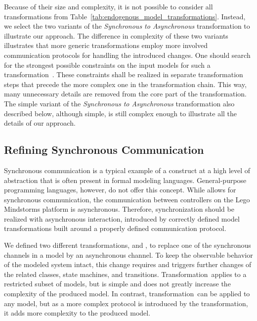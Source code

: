 Because of their size and complexity, it is not possible to consider all transformations from Table~\ref{tab:endogenous_model_transformations}.
Instead, we select the two variants of the \emph{Synchronous to Asynchronous} transformation to illustrate our approach.
The difference in complexity of these two variants illustrates that more generic transformations employ more involved communication protocols for handling the introduced changes.
One should search for the strongest possible constraints on the input models for such a transformation~\cite{SLCOexploring2011}.
These constraints shall be realized in separate transformation steps that precede the more complex one in the transformation chain.
This way, many unnecessary details are removed from the core part of the transformation.
The simple variant of the \emph{Synchronous to Asynchronous} transformation also described below, although simple, is still complex enough to illustrate all the  details of our approach.

\subsection{Refining Synchronous Communication}
\label{subsec:reusable-correct-transformations:sync_to_async}
Synchronous communication is a typical example of a construct at a high level of abstraction that is often present in formal modeling languages.
General-purpose programming languages, however, do not offer this concept.
While \SLCO allows for syn\-chro\-nous communication, the communication between controllers on the Lego Mindstorms platform is asynchronous.
Therefore, synchronization should be realized with asynchronous interaction, introduced by correctly defined model transformations built around a properly defined communication protocol.

\clearpage

We defined two different transformations, \TSim and \TGen, to replace one of the synchronous channels in a model by an asynchronous channel.
To keep the observable behavior of the modeled system intact, this change requires and triggers further changes of the related classes, state machines, and transitions.
Transformation~\TSim applies to a restricted subset of models, but is simple and does not greatly increase the complexity of the produced model.
In contrast, transformation~\TGen can be applied to any \SLCO model, but as a more complex protocol is introduced by the transformation, it adds more complexity to the produced model.

